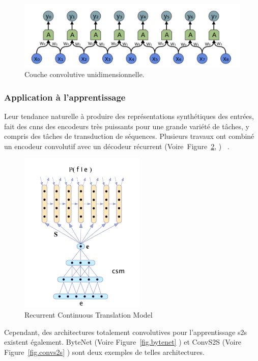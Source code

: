 \begin{figure}[hbt]
    \begin{center}
        \includegraphics[width=\textwidth]{assets/images/conv1d.png}
    \end{center}    
    \caption{Couche convolutive unidimensionnelle.}
    \label{fig.layer-conv1d}
\end{figure}


\subsubsection{Application à l'apprentissage }

Leur tendance naturelle à produire des représentations synthétiques des entrées,
fait des \glspl{cnn} des encodeurs très puissants pour une grande variété de tâches,
y compris des tâches de transduction de séquences.
Plusieurs travaux ont combiné un encodeur convolutif avec un décodeur récurrent%
(Voire~Figure~\ref{fig.rctm}, )%
~\cite{deep-nmt-survey}.

\begin{figure}[hbt]
    \centering
    \includegraphics[width=6cm]{assets/images/ctrm.png}
    \caption{Recurrent Continuous Translation Model}
    \label{fig.rctm}
\end{figure}

Cependant, des architectures totalement convolutives pour l'apprentissage \gls{s2s} existent également.
ByteNet (Voire Figure~\ref{fig.bytenet}
)
et ConvS2S (Voire Figure~\ref{fig.convs2s}
)
sont deux exemples de telles architectures.


